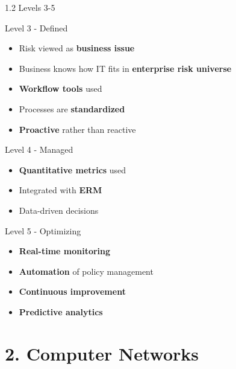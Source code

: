\documentclass{beamer}
\begin{document}
	\begin{frame}{1.2 Levels 3-5}
		\begin{block}{Level 3 - Defined}
			\begin{itemize}
				\item Risk viewed as \textbf{business issue}
				\item Business knows how IT fits in \textbf{enterprise risk universe}
				\item \textbf{Workflow tools} used
				\item Processes are \textbf{standardized}
				\item \textbf{Proactive} rather than reactive
			\end{itemize}
		\end{block}
		
		\begin{block}{Level 4 - Managed}
			\begin{itemize}
				\item \textbf{Quantitative metrics} used
				\item Integrated with \textbf{ERM}
				\item Data-driven decisions
			\end{itemize}
		\end{block}
		
		\begin{block}{Level 5 - Optimizing}
			\begin{itemize}
				\item \textbf{Real-time monitoring}
				\item \textbf{Automation} of policy management
				\item \textbf{Continuous improvement}
				\item \textbf{Predictive analytics}
			\end{itemize}
		\end{block}
	\end{frame}
	
	\section{2. Computer Networks}
	
\end{document}
